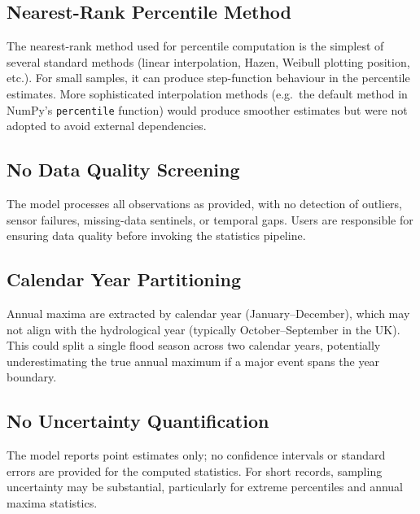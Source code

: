 \documentclass[11pt,a4paper]{article}
\begin{document}
\clearpage

\mkmlimitations

\subsection{Nearest-Rank Percentile Method}

The nearest-rank method used for percentile computation is the simplest of several standard methods (linear interpolation, Hazen, Weibull plotting position, etc.). For small samples, it can produce step-function behaviour in the percentile estimates. More sophisticated interpolation methods (e.g.\ the default method in NumPy's \texttt{percentile} function) would produce smoother estimates but were not adopted to avoid external dependencies.

\subsection{No Data Quality Screening}

The model processes all observations as provided, with no detection of outliers, sensor failures, missing-data sentinels, or temporal gaps. Users are responsible for ensuring data quality before invoking the statistics pipeline.

\subsection{Calendar Year Partitioning}

Annual maxima are extracted by calendar year (January--December), which may not align with the hydrological year (typically October--September in the UK). This could split a single flood season across two calendar years, potentially underestimating the true annual maximum if a major event spans the year boundary.

\subsection{No Uncertainty Quantification}

The model reports point estimates only; no confidence intervals or standard errors are provided for the computed statistics. For short records, sampling uncertainty may be substantial, particularly for extreme percentiles and annual maxima statistics.
\end{document}
